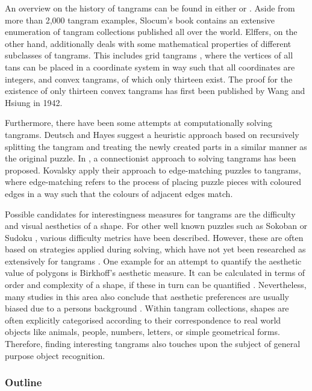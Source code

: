 An overview on the history of tangrams can be found in either \cite{slocum03} or \cite{elffers76}. Aside from more than 2,000 tangram examples, Slocum's book contains an extensive enumeration of tangram collections published all over the world. Elffers, on the other hand, additionally deals with some mathematical properties of different subclasses of tangrams. This includes grid tangrams \cite{koeller99}, where the vertices of all tans can be placed in a coordinate system in way such that all coordinates are integers, and convex tangrams, of which only thirteen exist. The proof for the existence of only thirteen convex tangrams has first been published by Wang and Hsiung \cite{wang42} in 1942.

Furthermore, there have been some attempts at computationally solving tangrams. Deutsch and Hayes \cite{deutsch72} suggest a heuristic approach based on recursively splitting the tangram and treating the newly created parts in a similar manner as the original puzzle. In \cite{oflazer93}, a connectionist approach to solving tangrams has been proposed. Kovalsky \etal \cite{kovalsky14} apply their approach to edge-matching puzzles to tangrams, where edge-matching refers to the process of placing puzzle pieces with coloured edges in a way such that the colours of adjacent edges match.

Possible candidates for interestingness measures for tangrams are the difficulty and visual aesthetics of a shape. For other well known puzzles such as Sokoban \cite{jaruvsek10} or Sudoku \cite{hunt07}, various difficulty metrics have been described. However, these are often based on strategies applied during solving, which have not yet been researched as extensively for tangrams \cite{baran07}. One example for an attempt to quantify the aesthetic value of polygons is Birkhoff's aesthetic measure. It can be calculated in terms of order and complexity of a shape, if these in turn can be quantified \cite{filonik09}. Nevertheless, many studies in this area also conclude that aesthetic preferences are usually biased due to a persons background \cite{eberle14}. Within tangram collections, shapes are often explicitly categorised according to their correspondence to real world objects like animals, people, numbers, letters, or simple geometrical forms. Therefore, finding interesting tangrams also touches upon the subject of general purpose object recognition. 

\subsubsection*{Outline}

